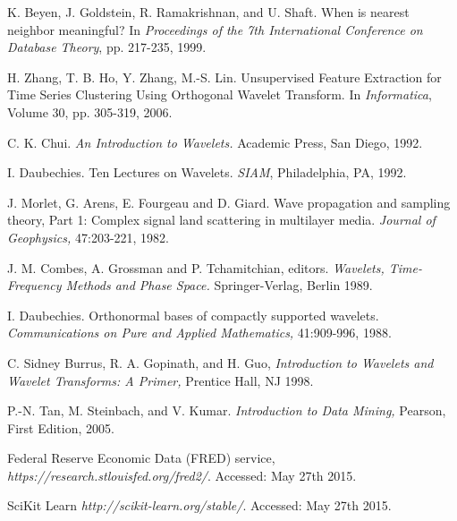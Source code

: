 \documentclass{article}
\begin{document}
\begin{thebibliography}{1}

 K. Beyen, J. Goldstein, R. Ramakrishnan, and U. Shaft. When is nearest neighbor meaningful? In {\em Proceedings of the 7th International Conference on Database Theory}, pp. 217-235, 1999.

 H. Zhang, T. B. Ho, Y. Zhang, M.-S. Lin. Unsupervised Feature Extraction for Time Series Clustering Using Orthogonal Wavelet Transform. In {\em Informatica}, Volume 30, pp. 305-319, 2006.

 C. K. Chui. {\em An Introduction to Wavelets.} Academic Press, San Diego, 1992.

 I. Daubechies. Ten Lectures on Wavelets. {\em SIAM}, Philadelphia, PA, 1992.

 J. Morlet, G. Arens, E. Fourgeau and D. Giard. Wave propagation and sampling theory, Part 1: Complex  signal land scattering in multilayer media. {\em Journal of Geophysics,} 47:203-221, 1982.

 J. M. Combes, A. Grossman and P. Tchamitchian, editors. {\em Wavelets, Time-Frequency Methods and Phase Space.} Springer-Verlag, Berlin 1989.

 I. Daubechies. Orthonormal bases of compactly supported wavelets. {\em Communications on Pure and Applied Mathematics,} 41:909-996, 1988.

 C. Sidney Burrus, R. A. Gopinath, and H. Guo, {\em Introduction to Wavelets and Wavelet Transforms: A Primer,} Prentice Hall, NJ 1998.

 P.-N. Tan, M. Steinbach, and V. Kumar. {\em Introduction to Data Mining,} Pearson, First Edition, 2005.

 Federal Reserve Economic Data (FRED) service, {\em https://research.stlouisfed.org/fred2/}. Accessed: May 27th 2015.

 SciKit Learn {\em http://scikit-learn.org/stable/}. Accessed: May 27th 2015.

\end{thebibliography}
\end{document}
